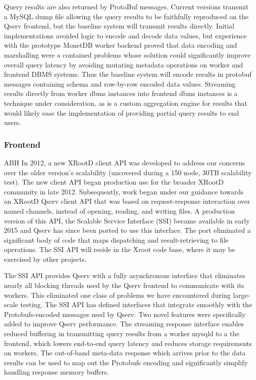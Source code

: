\documentclass[DM,lsstdraft,toc]{lsstdoc}
\begin{document}
Query results are also returned by ProtoBuf messages. Current versions
transmit a MySQL dump file allowing the query results to be faithfully
reproduced on the Qserv frontend, but the baseline system will transmit
results directly. Initial implementations avoided logic to encode and
decode data values, but experience with the prototype MonetDB worker
backend proved that data encoding and marshalling were a contained
problems whose solution could significantly improve overall query
latency by avoiding mutating metadata operations on worker and frontend
DBMS systems. Thus the baseline system will encode results in protobuf
messages containing schema and row-by-row encoded data values. Streaming
results directly from worker dbms instances into frontend dbms instances
is a technique under consideration, as is a custom aggregation engine
for results that would likely ease the implementation of providing
partial query results to end users.

\subsubsection{Frontend}\label{frontend}

ABH In 2012, a new XRootD client API was
developed to address our concerns over the older version's scalability
(uncovered during a 150 node, 30TB scalability test). The new client API
began production use for the broader XRootD
community in late 2012. Subsequently, work began under our guidance
towards an XRootD Qserv client API that was
based on request-response interaction over named channels, instead of
opening, reading, and writing files. A production version of this API,
the Scalable Service Interface (SSI) became available in early
2015 and Qserv has since been ported to use this interface. The port
eliminated a significant body of code that maps dispatching and
result-retrieving to file operations. The SSI API will reside
in the Xroot code base, where it may be exercised by other projects.

The SSI API provides Qserv with a fully asynchronous interface
that eliminates nearly all blocking threads used by the Qserv frontend
to communicate with its workers. This eliminated one class of problems
we have encountered during large-scale testing. The SSI API has
defined interfaces that integrate smoothly with the Protobufs-encoded
messages used by Qserv. Two novel features were specifically added to
improve Qserv performance. The streaming response interface enables
reduced buffering in transmitting query results from a worker mysqld to
a the frontend, which lowers end-to-end query latency and reduces
storage requirements on workers. The out-of-band meta-data response
which arrives prior to the data results can be used to map out the
Protobufs encoding and significantly simplify handling response memory
buffers.
\end{document}
